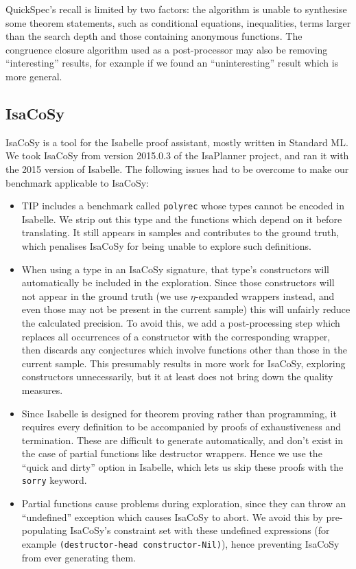 QuickSpec's recall is limited by two factors: the algorithm is unable to
synthesise some theorem statements, such as conditional equations, inequalities,
terms larger than the search depth and those containing anonymous functions.
The congruence closure algorithm used as a post-processor may also be removing
``interesting'' results, for example if we found an ``uninteresting'' result
which is more general.

\subsection{IsaCoSy}

IsaCoSy is a tool for the Isabelle proof assistant, mostly written in Standard
ML. We took IsaCoSy from version 2015.0.3 of the IsaPlanner project, and ran it
with the 2015 version of Isabelle. The following issues had to be overcome to
make our benchmark applicable to IsaCoSy:

\begin{itemize}
\item TIP includes a benchmark called \texttt{polyrec} whose types cannot be
  encoded in Isabelle. We strip out this type and the functions which depend on
  it before translating. It still appears in samples and contributes to the
  ground truth, which penalises IsaCoSy for being unable to explore such
  definitions.
\item When using a type in an IsaCoSy signature, that type's constructors will
  automatically be included in the exploration. Since those constructors will
  not appear in the ground truth (we use $\eta$-expanded wrappers instead, and
  even those may not be present in the current sample) this will unfairly reduce
  the calculated precision. To avoid this, we add a post-processing step which
  replaces all occurrences of a constructor with the corresponding wrapper, then
  discards any conjectures which involve functions other than those in the
  current sample. This presumably results in more work for IsaCoSy, exploring
  constructors unnecessarily, but it at least does not bring down the quality
  measures.
\item Since Isabelle is designed for theorem proving rather than programming, it
  requires every definition to be accompanied by proofs of exhaustiveness and
  termination. These are difficult to generate automatically, and don't exist in
  the case of partial functions like destructor wrappers. Hence we use the
  ``quick and dirty'' option in Isabelle, which lets us skip these proofs with
  the \texttt{sorry} keyword.
\item Partial functions cause problems during exploration, since they can throw
  an ``undefined'' exception which causes IsaCoSy to abort. We avoid this by
  pre-populating IsaCoSy's constraint set with these undefined expressions
  (for example \texttt{(destructor-head constructor-Nil)}), hence preventing
  IsaCoSy from ever generating them.
\end{itemize}

